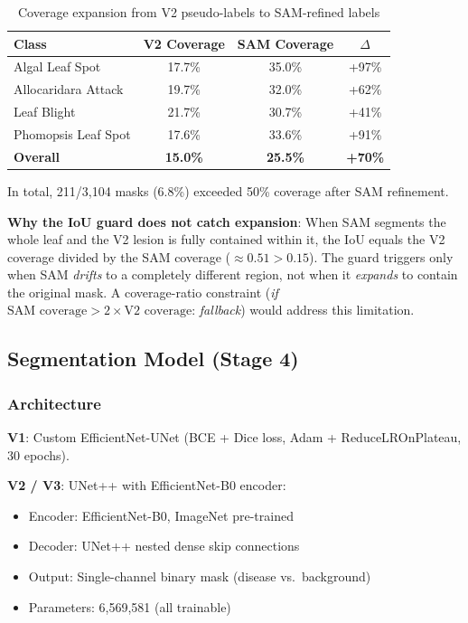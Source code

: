 \documentclass[10pt,a4paper]{article}
\begin{document}
\begin{table}[H]
\centering
\caption{Coverage expansion from V2 pseudo-labels to SAM-refined labels}
\label{tab:sam_expansion}
\begin{tabular}{lccc}
\toprule
\textbf{Class} & \textbf{V2 Coverage} & \textbf{SAM Coverage} & \textbf{$\Delta$} \\
\midrule
Algal Leaf Spot     & 17.7\% & 35.0\% & +97\% \\
Allocaridara Attack & 19.7\% & 32.0\% & +62\% \\
Leaf Blight         & 21.7\% & 30.7\% & +41\% \\
Phomopsis Leaf Spot & 17.6\% & 33.6\% & +91\% \\
\midrule
\textbf{Overall}    & \textbf{15.0\%} & \textbf{25.5\%} & \textbf{+70\%} \\
\bottomrule
\end{tabular}
\end{table}

In total, 211/3,104 masks (6.8\%) exceeded 50\% coverage after SAM refinement.

\textbf{Why the IoU guard does not catch expansion}: When SAM segments the whole leaf and the V2 lesion is fully contained within it, the IoU equals the V2 coverage divided by the SAM coverage ($\approx 0.51 > 0.15$). The guard triggers only when SAM \textit{drifts} to a completely different region, not when it \textit{expands} to contain the original mask. A coverage-ratio constraint (\emph{if} $\text{SAM coverage} > 2 \times \text{V2 coverage}$: \emph{fallback}) would address this limitation.

\subsection{Segmentation Model (Stage 4)}

\subsubsection{Architecture}

\textbf{V1}: Custom EfficientNet-UNet (BCE + Dice loss, Adam + ReduceLROnPlateau, 30 epochs).

\textbf{V2 / V3}: UNet++ \cite{zhou2018unet++} with EfficientNet-B0 encoder:
\begin{itemize}
\item Encoder: EfficientNet-B0, ImageNet pre-trained
\item Decoder: UNet++ nested dense skip connections
\item Output: Single-channel binary mask (disease vs.\ background)
\item Parameters: 6,569,581 (all trainable)
\end{itemize}
\end{document}
